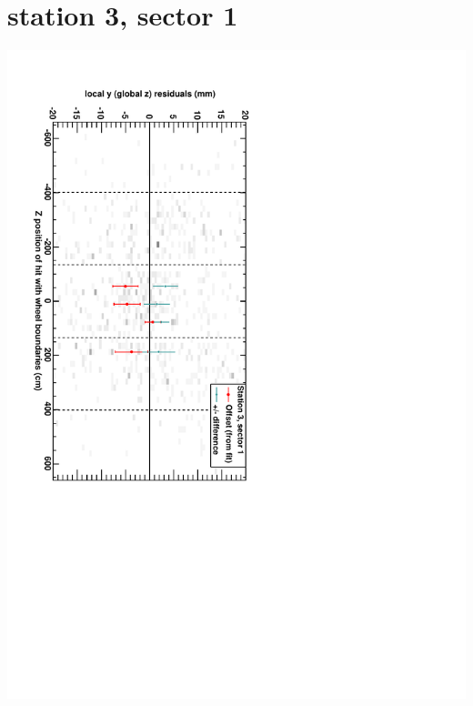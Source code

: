 \documentclass[compress]{beamer}
\begin{document}
\section*{station 3, sector 1}
\begin{frame} \vfill \mbox{\hspace{-1 cm}\includegraphics[height=1.2\linewidth, angle=90]{DTzVsZ_st3_sr01.pdf}} \end{frame}
\end{document}
